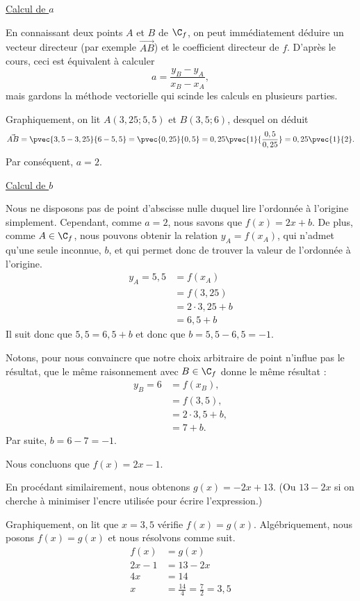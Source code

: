 {	\underline{Calcul de $a$}
	
	En connaissant deux points $A$ et $B$ de $\C_f$, on peut immédiatement déduire un vecteur directeur (par exemple $\vec{AB}$) et le coefficient directeur de $f$.
	D'après le cours, ceci est équivalent à calculer 
		\[ a = \dfrac{y_B - y_A}{x_B - x_A}, \]
	mais gardons la méthode vectorielle qui scinde les calculs en plusieurs parties.
	
	Graphiquement, on lit $A(3,25 ; 5,5)$ et $B(3,5 ; 6)$, desquel on déduit
		\[ \vec{AB} = \pvec{3,5-3,25}{6-5,5} = \pvec{0,25}{0,5} = 0,25 \pvec{1}{\frac{0,5}{0,25}} = 0,25 \pvec{1}{2}. \]
	Par conséquent, $a = 2$.
	
	\underline{Calcul de $b$}
	
	Nous ne disposons pas de point d'abscisse nulle duquel lire l'ordonnée à l'origine simplement.
	Cependant, comme $a =2$, nous savons que $f(x) = 2x+b$.
	De plus, comme $A\in\C_f$, nous pouvons obtenir la relation $y_A = f(x_A)$, qui n'admet qu'une seule inconnue, $b$, et qui permet donc de trouver la valeur de l'ordonnée à l'origine.
	\begin{align*}
		y_A = 5,5 &= f(x_A) \\
					&= f(3,25) \\
					&= 2\cdot3,25 + b \\
					&= 6,5 + b
	\end{align*}
	Il suit donc que $5,5 = 6,5+b$ et donc que $b = 5,5-6,5 = -1$.
	
	Notons, pour nous convaincre que notre choix arbitraire de point n'influe pas le résultat, que le même raisonnement avec $B\in\C_f$ donne le même résultat :
	\begin{align*}
		y_B = 6 &= f(x_B), \\
					&= f(3,5), \\
					&= 2\cdot3,5 + b, \\
					&= 7 + b.
	\end{align*}
	Par suite, $b = 6-7 = -1$.
	
	Nous concluons que $f(x) = 2x - 1$.
	
	
	En procédant similairement, nous obtenons $g(x) = -2x + 13$. (Ou $13-2x$ si on cherche à minimiser l'encre utilisée pour écrire l'expression.)
	
	Graphiquement, on lit que $x=3,5$ vérifie $f(x) = g(x)$.
	Algébriquement, nous posons $f(x) = g(x)$ et nous résolvons comme suit.
		\begin{align*}
			f(x) &= g(x) \\
			2x - 1 &= 13 - 2x \\
			4x &= 14 \\
			x &= \frac{14}4 = \frac72 = 3,5
		\end{align*}
}



